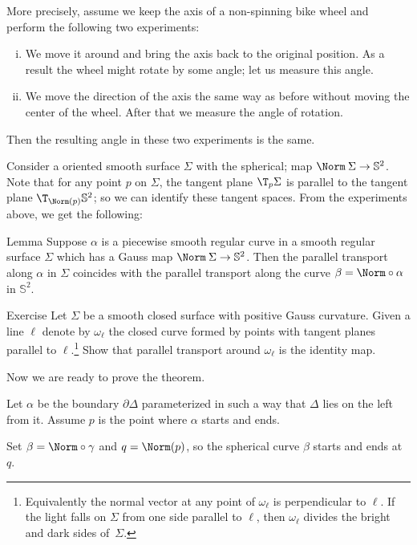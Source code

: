 More precisely, assume we keep the axis of a non-spinning bike wheel and perform the following two experiments:
\begin{enumerate}[(i)]
\item We move it around and bring the axis back to the original position. 
As a result the wheel might rotate by some angle; let us measure this angle.

\item
We move the direction of the axis the same way as before without moving the center of the wheel.
After that we measure the angle of rotation.
\end{enumerate}
Then the resulting angle in these two experiments is the same. 

Consider a oriented smooth surface $\Sigma$ with the spherical; map $\Norm\:\Sigma\to \mathbb{S}^2$.
Note that for any point $p$ on $\Sigma$, the tangent plane $\T_p\Sigma$ is parallel to the tangent plane $\T_{\Norm(p)}\mathbb{S}^2$; so we can identify these tangent spaces.
From the experiments above, we get the following:

\begin{thm}{Lemma}\label{lem:spherical-image}
Suppose $\alpha$ is a piecewise smooth regular curve in a smooth regular surface $\Sigma$ which has a Gauss map $\Norm\:\Sigma\to \mathbb{S}^2$.
Then the parallel transport along $\alpha$ in $\Sigma$ coincides with the parallel transport along the curve $\beta=\Norm\circ\alpha$ in $\mathbb{S}^2$.
\end{thm}

\begin{thm}{Exercise}
Let $\Sigma$ be a smooth closed surface with positive Gauss curvature.
Given a line $\ell$ denote by $\omega_\ell$ the closed curve formed by points with tangent planes parallel to $\ell$.\footnote{Equivalently the normal vector at any point of $\omega_\ell$ is perpendicular to $\ell$. If the light falls on $\Sigma$ from one side parallel to $\ell$, then $\omega_\ell$ divides the bright and dark sides of~$\Sigma$.}
Show that parallel transport around $\omega_\ell$ is the identity map.
\end{thm}

Now we are ready to prove the theorem.

Let $\alpha$ be the boundary $\partial\Delta$ parameterized in such a way that $\Delta$ lies on the left from it.
Assume $p$ is the point where $\alpha$ starts and ends.

Set $\beta=\Norm\circ\gamma$ and $q=\Norm(p)$, so the spherical curve $\beta$ starts and ends at $q$.

